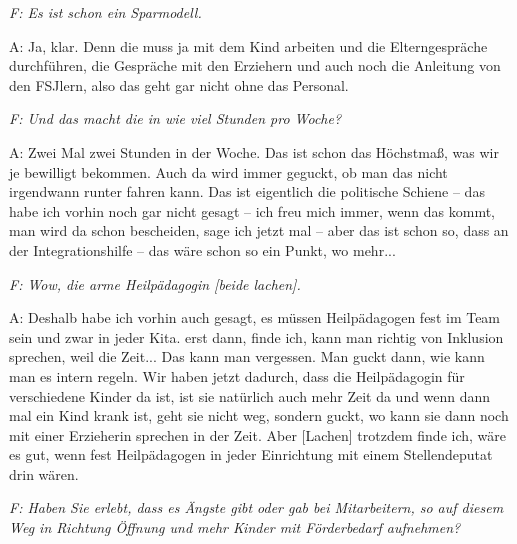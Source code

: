 \begin{linenumbers*}
\emph{F: Es ist schon ein Sparmodell.}

A: Ja, klar.  
Denn die muss ja mit dem Kind arbeiten und die Elterngespräche durchführen, die Gespräche mit den Erziehern und auch noch die Anleitung von den FSJlern, also das geht gar nicht ohne das Personal.

\emph{F: Und das macht die in wie viel Stunden pro Woche?}

A: Zwei Mal zwei Stunden in der Woche. Das ist schon das Höchstmaß, was wir je bewilligt bekommen. Auch da wird immer geguckt, ob man das nicht irgendwann runter fahren kann. Das ist eigentlich die politische Schiene -- das habe ich vorhin noch gar nicht gesagt -- ich freu mich immer, wenn das kommt, man wird da schon bescheiden, sage ich jetzt mal -- aber das ist schon so, dass an der Integrationshilfe -- das wäre schon so ein Punkt, wo mehr...

\emph{F: Wow, die arme Heilpädagogin [beide lachen].}

A: Deshalb habe ich vorhin auch gesagt, es müssen Heilpädagogen fest im Team sein und zwar in jeder Kita. erst dann, finde ich, kann man richtig von Inklusion sprechen, weil die Zeit... Das kann man vergessen. Man guckt dann, wie kann man es intern regeln. Wir haben jetzt dadurch, dass die Heilpädagogin für verschiedene Kinder da ist, ist sie natürlich auch mehr Zeit da und wenn dann mal ein Kind krank ist, geht sie nicht weg, sondern guckt, wo kann sie dann noch mit einer Erzieherin sprechen in der Zeit. Aber [Lachen] trotzdem finde ich, wäre es gut, wenn fest Heilpädagogen in jeder Einrichtung mit einem Stellendeputat drin wären. 

\emph{F: Haben Sie erlebt, dass es Ängste gibt oder gab bei Mitarbeitern, so auf diesem Weg in Richtung Öffnung und mehr Kinder mit Förderbedarf aufnehmen?}


\end{linenumbers*}
